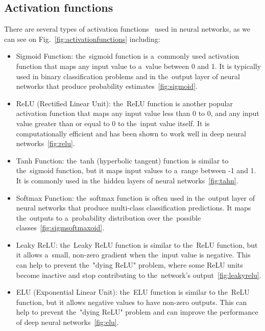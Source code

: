     \subsection{Activation functions} \label{subsec:nnaf}
    There are several types of activation functions~\cite{geron2022hands} used in neural networks, as we can see on Fig.~\ref{fig:activationfunctions} including:
    \begin{itemize}
        \item Sigmoid Function: the~sigmoid function is a~commonly used activation function that maps any input value to a~value between 0 and 1. It is typically used in binary classification problems and in the~output layer of neural networks that produce probability estimates~\ref{fig:sigmoid}.
        \item ReLU (Rectified Linear Unit): the~ReLU function is another popular activation function that maps any input value less than 0 to 0, and any input value greater than or equal to 0 to the~input value itself. It is computationally efficient and has been shown to work well in deep neural networks~\ref{fig:relu}.
        \item Tanh Function: the~tanh (hyperbolic tangent) function is similar to the~sigmoid function, but it maps input values to a~range between -1 and 1. It is commonly used in the~hidden layers of neural networks~\ref{fig:tahn}.
        \item Softmax Function: the~softmax function is often used in the~output layer of neural networks that produce multi-class classification predictions. It maps the~outputs to a~probability distribution over the~possible classes~\ref{fig:sigmsoftmaxoid}.
        \item Leaky ReLU: the~Leaky ReLU function is similar to the~ReLU function, but it allows a~small, non-zero gradient when the~input value is negative. This can help to prevent the~"dying ReLU" problem, where some ReLU units become inactive and stop contributing to the~network's output~\ref{fig:leakyrelu}.
        \item ELU (Exponential Linear Unit): the~ELU function is similar to the~ReLU function, but it allows negative values to have non-zero outputs. This can help to prevent the~"dying ReLU" problem and can improve the performance of deep neural networks~\ref{fig:elu}.
    \end{itemize}
    
